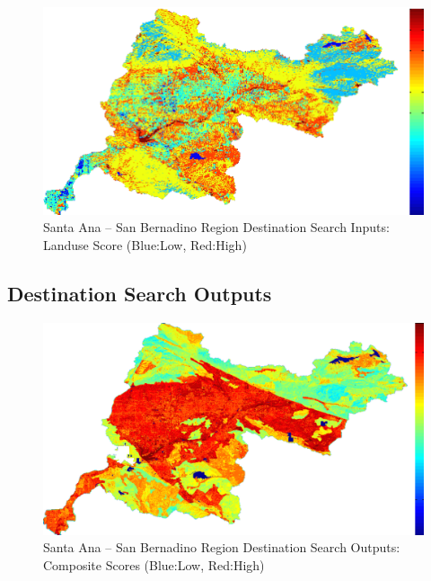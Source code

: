         \begin{figure}[!h]
            \begin{center}
            \includegraphics[width=5.5in]{figures/SanBernadino_Search_Landuse.png}   
            \caption{Santa Ana -- San Bernadino Region Destination Search Inputs: Landuse Score (Blue:Low, Red:High)}
            \label{fig:SASBdsinputs_landuse}
            \end{center}
        \end{figure}
    
    \subsection{Destination Search Outputs}
    
        \begin{figure}[!h]
            \begin{center}
            \includegraphics[width=5.5in]{figures/SanBernadino_Search_Composite.png}   
            \caption{Santa Ana -- San Bernadino Region Destination Search Outputs: Composite Scores (Blue:Low, Red:High)}
            \label{fig:SASBdsoutputs_comp}
            \end{center}
        \end{figure}
        
